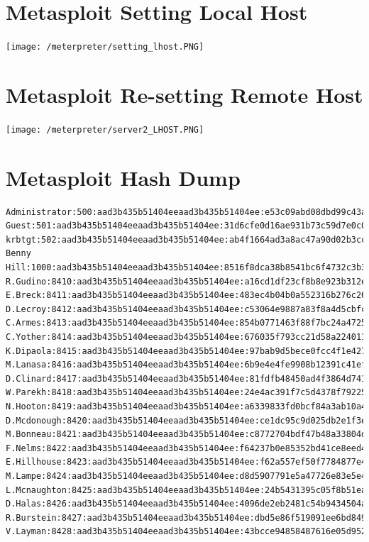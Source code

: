 \documentclass[12pt,a4paper]{article}
\begin{document}
\begin{appendices}
	\section{Metasploit Setting Local Host}
		\texttt{[image: /meterpreter/setting\_lhost.PNG]}
	\section{Metasploit Re-setting Remote Host}
		\texttt{[image: /meterpreter/server2\_LHOST.PNG]}
	\section{Metasploit Hash Dump}
		\begin{lstlisting}
Administrator:500:aad3b435b51404eeaad3b435b51404ee:e53c09abd08dbd99c43a1efec560f45f:::
Guest:501:aad3b435b51404eeaad3b435b51404ee:31d6cfe0d16ae931b73c59d7e0c089c0:::
krbtgt:502:aad3b435b51404eeaad3b435b51404ee:ab4f1664ad3a8ac47a90d02b3cc4fa37:::
Benny Hill:1000:aad3b435b51404eeaad3b435b51404ee:8516f8dca38b8541bc6f4732c3b304f2:::
R.Gudino:8410:aad3b435b51404eeaad3b435b51404ee:a16cd1df23cf8b8e923b312e9ab3f5d4:::
E.Breck:8411:aad3b435b51404eeaad3b435b51404ee:483ec4b04b0a552316b276c2624a34fa:::
D.Lecroy:8412:aad3b435b51404eeaad3b435b51404ee:c53064e9887a83f8a4d5cbfcef972305:::
C.Armes:8413:aad3b435b51404eeaad3b435b51404ee:854b0771463f88f7bc24a4725f84e8cb:::
C.Yother:8414:aad3b435b51404eeaad3b435b51404ee:676035f793cc21d58a224011ea06bab2:::
K.Dipaola:8415:aad3b435b51404eeaad3b435b51404ee:97bab9d5bece0fcc4f1e4276b86b7cd2:::
M.Lanasa:8416:aad3b435b51404eeaad3b435b51404ee:6b9e4e4fe9908b12391c41ef35b7b1c3:::
D.Clinard:8417:aad3b435b51404eeaad3b435b51404ee:81fdfb48450ad4f3864d741a01ca2e21:::
W.Parekh:8418:aad3b435b51404eeaad3b435b51404ee:24e4ac391f7c5d4378f792253e356f22:::
N.Hooton:8419:aad3b435b51404eeaad3b435b51404ee:a6339833fd0bcf84a3ab10a42fa7b59a:::
D.Mcdonough:8420:aad3b435b51404eeaad3b435b51404ee:ce1dc95c9d025db2e1f3ea85c40236be:::
M.Bonneau:8421:aad3b435b51404eeaad3b435b51404ee:c8772704bdf47b48a33804df97f67850:::
F.Nelms:8422:aad3b435b51404eeaad3b435b51404ee:f64237b0e85352bd41ce8eed475d8421:::
E.Hillhouse:8423:aad3b435b51404eeaad3b435b51404ee:f62a557ef50f7784877e4f9a56e159e6:::
M.Lampe:8424:aad3b435b51404eeaad3b435b51404ee:d8d5907791e5a47726e83e5e46f2af40:::
L.Mcnaughton:8425:aad3b435b51404eeaad3b435b51404ee:24b5431395c05f8b51ea696b56a753d5:::
D.Halas:8426:aad3b435b51404eeaad3b435b51404ee:4096de2eb2481c54b9434504a6bd2626:::
R.Burstein:8427:aad3b435b51404eeaad3b435b51404ee:dbd5e86f519091ee6bd8493ab5a11495:::
V.Layman:8428:aad3b435b51404eeaad3b435b51404ee:43bcce94858487616e05d95296ede293:::

\end{lstlisting}
\end{appendices}
\end{document}
